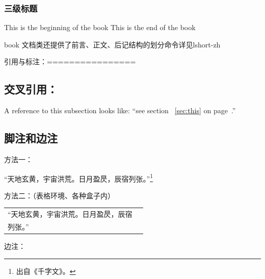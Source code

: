 \documentclass[10pt,a4paper,twocolumn]{book}
\begin{document}
\subsubsection{三级标题} %
\clearpage
This is the beginning of the book
\clearpage
This is the end of the book

book 文档类还提供了前言、正文、后记结构的划分命令详见lshort-zh

引用与标注：================

\subsection{交叉引用：}

A reference to this subsection 
\label{sec:this} looks like: 
``see section~ \ref{sec:this} on 
page~\pageref{sec:this}.''
\subsection{脚注和边注}
方法一：

“天地玄黄，宇宙洪荒。日月盈昃，辰宿列张。”\footnote{出自《千字文》。}

方法二：（表格环境、各种盒子内）

\begin{tabular}{l l} 
    \hline
    “天地玄黄，宇宙洪荒。日月盈昃，辰宿\\列张。”
    \footnotemark \\ 
    \hline
\end{tabular} 

边注：
\end{document}
